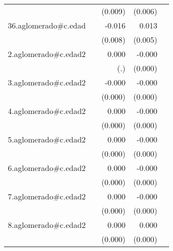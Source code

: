 {\begin{longtable}{l*{4}{D{.}{.}{-1}}}
            &                     &     (0.009)         &     (0.006)         &                     \\
\addlinespace
36.aglomerado#c.edad&                     &      -0.016         &       0.013\sym{*}  &                     \\
            &                     &     (0.008)         &     (0.005)         &                     \\
\addlinespace
2.aglomerado#c.edad2&                     &       0.000         &      -0.000\sym{**} &                     \\
            &                     &         (.)         &     (0.000)         &                     \\
\addlinespace
3.aglomerado#c.edad2&                     &      -0.000         &      -0.000\sym{**} &                     \\
            &                     &     (0.000)         &     (0.000)         &                     \\
\addlinespace
4.aglomerado#c.edad2&                     &       0.000         &      -0.000         &                     \\
            &                     &     (0.000)         &     (0.000)         &                     \\
\addlinespace
5.aglomerado#c.edad2&                     &       0.000         &      -0.000         &                     \\
            &                     &     (0.000)         &     (0.000)         &                     \\
\addlinespace
6.aglomerado#c.edad2&                     &       0.000         &      -0.000\sym{*}  &                     \\
            &                     &     (0.000)         &     (0.000)         &                     \\
\addlinespace
7.aglomerado#c.edad2&                     &       0.000         &      -0.000         &                     \\
            &                     &     (0.000)         &     (0.000)         &                     \\
\addlinespace
8.aglomerado#c.edad2&                     &       0.000         &       0.000         &                     \\
            &                     &     (0.000)         &     (0.000)         &                     \\

\end{longtable}}
